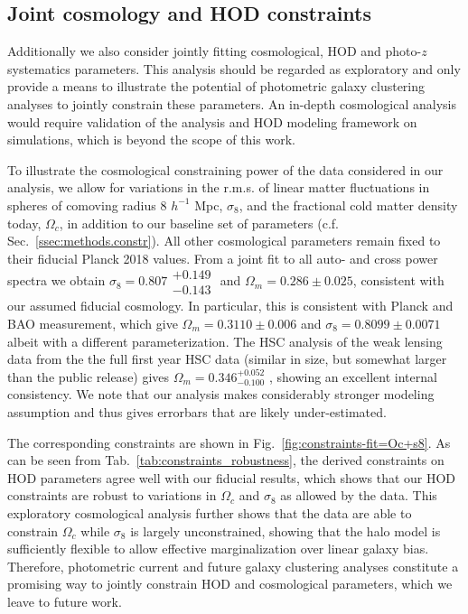 \documentclass[a4paper,11pt]{article}
\begin{document}
  \subsection{Joint cosmology and HOD constraints}\label{ssec:results.cosmo}
    Additionally we also consider jointly fitting cosmological, HOD and photo-$z$ systematics parameters. This analysis should be regarded as exploratory and only provide a means to illustrate the potential of photometric galaxy clustering analyses to jointly constrain these parameters. An in-depth cosmological analysis would require validation of the analysis and HOD modeling framework on simulations, which is beyond the scope of this work.

    To illustrate the cosmological constraining power of the data considered in our analysis, we allow for variations in the r.m.s. of linear matter fluctuations in spheres of comoving radius 8 $h^{-1}$ Mpc, $\sigma_{8}$, and the fractional cold matter density today, $\Omega_{c}$, in addition to our baseline set of parameters (c.f. Sec.~\ref{ssec:methods.constr}). All other cosmological parameters remain fixed to their fiducial Planck 2018 values. From a joint fit to all auto- and cross power spectra we obtain $\sigma_{8} = 0.807\substack{+0.149 \\ -0.143}$ and $\Omega_{m} = 0.286 \pm 0.025$,
    consistent with our assumed fiducial cosmology.  In particular, this is consistent with Planck and BAO measurement, which give $\Omega_m=0.3110\pm 0.006$ and $\sigma_8=0.8099 \pm 0.0071$ \cite{Planck:2018} albeit with a different parameterization. The HSC analysis of the weak lensing data from the the full first year HSC data (similar in size, but somewhat larger than the public release) gives $\Omega_m=0.346^{+0.052}_{-0.100}$ \cite{1906.06041}, showing an excellent internal consistency. We note that our analysis makes considerably stronger modeling assumption and thus gives errorbars that are likely under-estimated.

    The corresponding constraints are shown in Fig.~\ref{fig:constraints-fit=Oc+s8}. As can be seen from Tab.~\ref{tab:constraints_robustness}, the derived constraints on HOD parameters agree well with our fiducial results, which shows that our HOD constraints are robust to variations in $\Omega_{c}$ and $\sigma_{8}$ as allowed by the data. This exploratory cosmological analysis further shows that the data are able to constrain $\Omega_{c}$ while $\sigma_{8}$ is largely unconstrained, showing that the halo model is sufficiently flexible to allow effective marginalization over linear galaxy bias. Therefore, photometric current and future galaxy clustering analyses constitute a promising way to jointly constrain HOD and cosmological parameters, which we leave to future work. 
 
\end{document}
